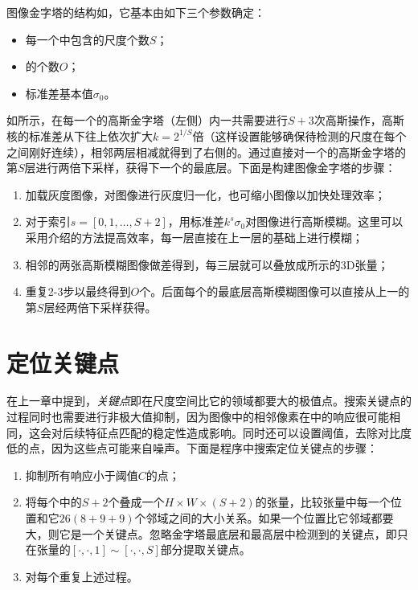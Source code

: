 \DoG 图像金字塔的结构如，它基本由如下三个参数确定：
\begin{itemize}
	\item 每一个\octave 中包含的尺度个数$S$；
	\item \octave 的个数$O$；
	\item 标准差基本值$\sigma_0$。
\end{itemize}

如所示，在每一个\octave 的高斯金字塔（左侧）内一共需要进行$S+3$次高斯操作，高斯核的标准差从下往上依次扩大$k=2^{1/S}$倍（这样设置能够确保待检测的尺度在每个\octave 之间刚好连续），相邻两层相减就得到了右侧的\DoG 。通过直接对一个\octave 的高斯金字塔的第$S$层进行两倍下采样，获得下一个\octave 的最底层。下面是构建\DoG 图像金字塔的步骤：
\begin{enumerate}
	\item 加载灰度图像，对图像进行灰度归一化，也可缩小图像以加快处理效率；
	\item 对于索引$s=[0, 1, \ldots, S+2]$，用标准差$k^s\sigma_0$对图像进行高斯模糊。这里可以采用介绍的方法提高效率，每一层直接在上一层的基础上进行模糊；
	\item 相邻的两张高斯模糊图像做差得到\DoG，每三层\DoG 就可以叠放成所示的3D张量；
	\item 重复2-3步以最终得到$O$个\octave 。后面每个\octave 的最底层高斯模糊图像可以直接从上一\octave 的第$S$层经两倍下采样获得。
\end{enumerate}

\section{定位关键点}

在上一章中提到，\emph{关键点}即在\DoG 尺度空间比它的领域都要大的极值点。搜索关键点的过程同时也需要进行非极大值抑制，因为图像中的相邻像素在\DoG 中的响应很可能相同，这会对后续特征点匹配的稳定性造成影响。同时还可以设置阈值，去除对比度低的点，因为这些点可能来自噪声。下面是程序中搜索定位关键点的步骤：
\begin{enumerate}
	\item 抑制所有响应小于阈值$C$的点；
	\item 将每个\octave 中的$S+2$个\DoG 叠成一个$H\times W\times (S+2)$的张量，比较张量中每一个位置和它$26(8+9+9)$个邻域之间的大小关系。如果一个位置比它邻域都要大，则它是一个关键点。忽略\DoG 金字塔最底层和最高层中检测到的关键点，即只在张量的$[\cdot, \cdot, 1]\sim [\cdot, \cdot, S]$部分提取关键点。
	\item 对每个\octave 重复上述过程。
\end{enumerate}

